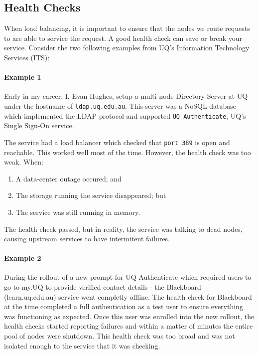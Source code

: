 \documentclass{csse4400}
\begin{document}
\subsection{Health Checks}

When load balancing, it is important to ensure that the nodes we route requests to are able to service the request.
A good health check can save or break your service.
Consider the two following examples from UQ's Information Technology Services (ITS):

\paragraph{Example 1} Early in my career, I, Evan Hughes, setup a multi-node Directory Server at UQ under the hostname of \texttt{ldap.uq.edu.au}.
This server was a NoSQL database which implemented the LDAP protocol and supported \texttt{UQ Authenticate},
UQ's Single Sign-On service.

The service had a load balancer which checked that \texttt{port 389} is open and reachable. 
This worked well most of the time.
However, the health check was too weak. When:
\begin{enumerate} 
    \item A data-center outage occured; and
    \item The storage running the service disappeared; but 
    \item The service was still running in memory.
\end{enumerate}

The health check passed, but in reality, the service was talking to dead nodes, causing upstream services to have intermitent failures. 

\paragraph{Example 2} During the rollout of a new prompt for UQ Authenticate which required users to go to my.UQ to provide verified contact details - the Blackboard (learn.uq.edu.au) service went completly offline.
The health check for Blackboard at the time completed a full authentication as a test user to ensure everything was functioning as expected.
Once this user was enrolled into the new rollout,
the health checks started reporting failures and within a matter of minutes the entire pool of nodes were shutdown.
This health check was too broad and was not isolated enough to the service that it was checking.
\end{document}
